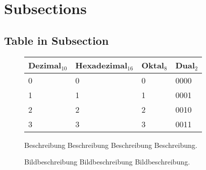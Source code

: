 \documentclass[a4paper, 12pt, xcolor=dvipsnames]{scrartcl}	%
\begin{document}
%
%

\section{Subsections}
%
%
\subsection{Table in Subsection}
\begin{figure}[h!]
	\begin{minipage}{0.6\textwidth}
		\begin {center}
		\begin{tabular}{|p{2.0cm}|p{3.0cm}|p{1.2cm}|p{1.2cm}|} \hline 
			\textbf{\parbox[0pt][2em][c]{0cm}{}Dezimal$_{10}$} & \textbf{Hexadezimal$_{16}$} & \textbf{Oktal$_{8}$} & \textbf{Dual$_{2}$}\\ \hline 
			0 & 0 & 0 & 0000\\ \hline 
			1 & 1 & 1 & 0001\\ \hline 	
			2 & 2 & 2 & 0010\\ \hline 
			3 & 3 & 3 & 0011\\ \hline 
		\end{tabular}
		\end {center}
    \end{minipage}%
    \begin{minipage}{0.4\textwidth}
	\linespread {1.25}
	Beschreibung Beschreibung Beschreibung Beschreibung.\\
      \caption{Bildbeschreibung Bildbeschreibung Bildbeschreibung.}
	\label{fig:table}
    \end{minipage}
\end{figure}

%
%
\end{document}

